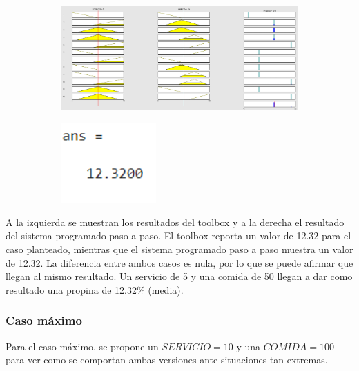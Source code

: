 \documentclass[11pt, letterpaper]{article}
\begin{document}
\begin{figure}[h]
	\centering
	\begin{subfigure}{0.40\textwidth} %
		\centering
		\includegraphics[width=1.4\textwidth]{IMG/RP12.png}
		\label{fig:G5}
	\end{subfigure}
	\hfill
	\begin{subfigure}{0.42\textwidth} %
		\centering
		\includegraphics[width=0.4\textwidth]{IMG/M12.png}
		\label{fig:G6}
	\end{subfigure}
	\label{fig:comparacion3}
\end{figure}

A la izquierda se muestran los resultados del toolbox y a la derecha el resultado del sistema programado paso a paso. El toolbox reporta un valor de 12.32 para el caso planteado, mientras que el sistema programado paso a paso muestra un valor de 12.32. La diferencia entre ambos casos es nula, por lo que se puede afirmar que llegan al mismo resultado. Un servicio de 5 y una comida de 50 llegan a dar como resultado una propina de 12.32\% (media).

\newpage

\subsubsection{Caso máximo}
Para el caso máximo, se propone un $SERVICIO = 10$ y una $COMIDA = 100$ para ver como se comportan ambas versiones ante situaciones tan extremas.
\end{document}
